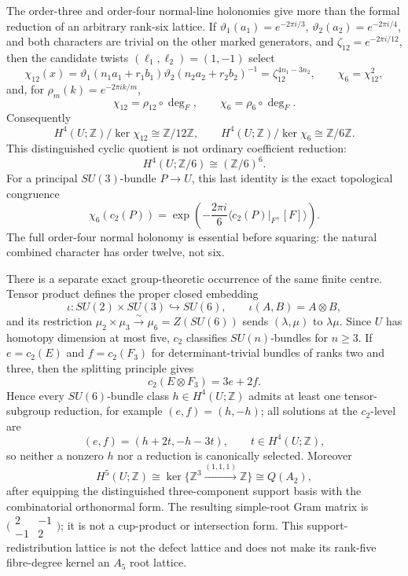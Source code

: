 \documentclass[10pt,letterpaper]{article}
\begin{document}
The order-three and order-four normal-line holonomies give more than the
formal reduction of an arbitrary rank-six lattice.  If
\(\vartheta_1(a_1)=e^{-2\pi i/3}\),
\(\vartheta_2(a_2)=e^{-2\pi i/4}\), and both characters are trivial on the
other marked generators, and \(\zeta_{12}=e^{-2\pi i/12}\), then the candidate twists
\((\ell_1,\ell_2)=(1,-1)\) select
\[
 \chi_{12}(x)
 =\vartheta_1(n_1a_1+r_1b_1)
  \vartheta_2(n_2a_2+r_2b_2)^{-1}
 =\zeta_{12}^{4n_1-3n_2},\qquad
 \chi_6=\chi_{12}^2,
\]
and, for \(\rho_m(k)=e^{-2\pi i k/m}\),
\[
 \boxed{\chi_{12}=\rho_{12}\circ\deg_F,\qquad
        \chi_6=\rho_6\circ\deg_F.}
\]
Consequently
\[
 H^4(U;\mathbb Z)/\ker\chi_{12}\cong\mathbb Z/12\mathbb Z,
 \qquad
 H^4(U;\mathbb Z)/\ker\chi_6\cong\mathbb Z/6\mathbb Z.
\]
This distinguished cyclic quotient is not ordinary coefficient reduction:
\[
 H^4(U;\mathbb Z/6)\cong(\mathbb Z/6)^6.
\]
For a principal \(SU(3)\)-bundle \(P\to U\), this last identity is the exact
topological congruence
\[
 \chi_6(c_2(P))
 =\exp\!\left(-\frac{2\pi i}{6}
 \langle c_2(P)|_F,[F]\rangle\right).
\]
The full order-four normal holonomy is essential before squaring: the natural
combined character has order twelve, not six.

There is a separate exact group-theoretic occurrence of the same finite
centre.  Tensor product defines the proper closed embedding
\[
 \iota:SU(2)\times SU(3)\hookrightarrow SU(6),\qquad
 \iota(A,B)=A\otimes B,
\]
and its restriction
\(\mu_2\times\mu_3\xrightarrow{\sim}\mu_6=Z(SU(6))\) sends
\((\lambda,\mu)\) to \(\lambda\mu\).  Since \(U\) has homotopy dimension at
most five, \(c_2\) classifies \(SU(n)\)-bundles for \(n\ge3\).  If
\(e=c_2(E)\) and \(f=c_2(F_3)\) for determinant-trivial bundles of ranks two
and three, then the splitting principle gives
\[
 c_2(E\otimes F_3)=3e+2f.
\]
Hence every \(SU(6)\)-bundle class \(h\in H^4(U;\mathbb Z)\) admits at least
one tensor-subgroup reduction, for example \((e,f)=(h,-h)\); all solutions at
the \(c_2\)-level are
\[
 (e,f)=(h+2t,-h-3t),\qquad t\in H^4(U;\mathbb Z),
\]
so neither a nonzero \(h\) nor a reduction is canonically selected.
Moreover
\[
 H^5(U;\mathbb Z)
 \cong\ker\{\mathbb Z^3\xrightarrow{(1,1,1)}\mathbb Z\}
\cong Q(A_2),
\]
after equipping the distinguished three-component support basis with the
combinatorial orthonormal form.  The resulting simple-root Gram matrix is
\(\bigl(\begin{smallmatrix}2&-1\\-1&2\end{smallmatrix}\bigr)\); it is not a
cup-product or intersection form.  This support-redistribution lattice is not
the defect lattice and does not make its rank-five fibre-degree kernel an
\(A_5\) root lattice.
\end{document}
